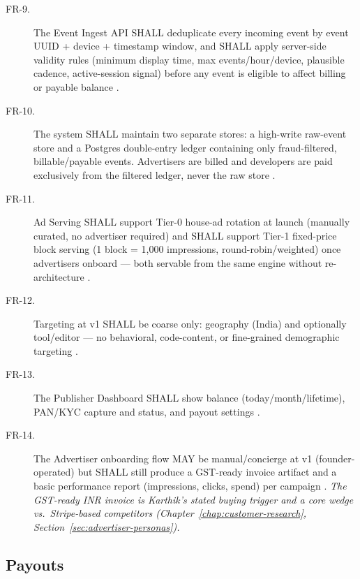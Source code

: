 \begin{description}
\item[FR-9.] The Event Ingest API SHALL deduplicate every incoming event by event UUID + device + timestamp window, and SHALL apply server-side validity rules (minimum display time, max events/hour/device, plausible cadence, active-session signal) before any event is eligible to affect billing or payable balance \cite{mvpspec_2026}.
\item[FR-10.] The system SHALL maintain two separate stores: a high-write raw-event store and a Postgres double-entry ledger containing only fraud-filtered, billable/payable events. Advertisers are billed and developers are paid exclusively from the filtered ledger, never the raw store \cite{mvpspec_2026}.
\item[FR-11.] Ad Serving SHALL support Tier-0 house-ad rotation at launch (manually curated, no advertiser required) and SHALL support Tier-1 fixed-price block serving (1 block = 1{,}000 impressions, round-robin/weighted) once advertisers onboard --- both servable from the same engine without re-architecture \cite{mvpspec_2026,masterplan_2026}.
\item[FR-12.] Targeting at v1 SHALL be coarse only: geography (India) and optionally tool/editor --- no behavioral, code-content, or fine-grained demographic targeting \cite{mvpspec_2026}.
\item[FR-13.] The Publisher Dashboard SHALL show balance (today/month/lifetime), PAN/KYC capture and status, and payout settings \cite{mvpspec_2026,prd_2026}.
\item[FR-14.] The Advertiser onboarding flow MAY be manual/concierge at v1 (founder-operated) but SHALL still produce a GST-ready invoice artifact and a basic performance report (impressions, clicks, spend) per campaign \cite{mvpspec_2026,prd_2026}. \emph{The GST-ready INR invoice is Karthik's stated buying trigger and a core wedge vs.\ Stripe-based competitors (Chapter~\ref{chap:customer-research}, Section~\ref{sec:advertiser-personas}).}
\end{description}

\subsection{Payouts}

